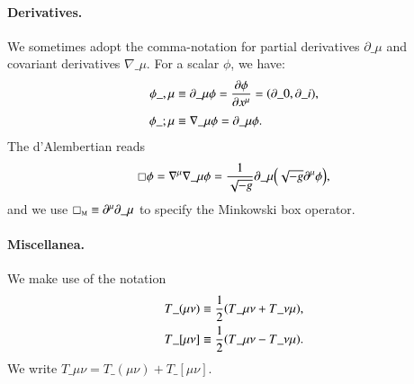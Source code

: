 




\paragraph{Derivatives.} 
We sometimes adopt the comma-notation for partial derivatives $\partial\_\mu$ and covariant derivatives $\nabla\_\mu$. For a scalar $\phi$, we have:
\begin{subequations}\label{eq:notation:comma_notation_darivatives}
    \begin{align}
        \phi\_{,\mu} &\equiv \partial\_\mu \phi = \pdv{\phi}{x\^\mu} =\pclosed{\partial\_0, \partial\_i }, \\
        \phi\_{;\mu} &\equiv \nabla\_\mu \phi = \partial\_\mu \phi . 
    \end{align}
\end{subequations}
The d'Alembertian reads
\begin{equation}\label{eq:notation:dAlembertian}
    \sq \phi  = \nabla\^\mu \nabla\_\mu \phi = \frac{1}{\sqrt{-g}} \partial\_\mu \pclosed{ \sqrt{-g} \partial\^\mu \phi},
\end{equation}
and we use $\sq\nped{M} \equiv \partial\^\mu\partial\_\mu$ to specify the Minkowski box operator.


\paragraph{Miscellanea.} %
We make use of the notation
\begin{subequations}\label{eq:notation:sym_and_antisym_tensor_notation}
    \begin{align}
        T\_{(\mu\nu)} &\equiv \frac{1}{2} {\left(  T\_{\mu\nu} + T\_{\nu\mu}   \right)}, \\
        T\_{[\mu\nu]} &\equiv \frac{1}{2} {\left(  T\_{\mu\nu} - T\_{\nu\mu}   \right)}.
    \end{align} 
\end{subequations}
We write $T\_{\mu\nu}= T\_{(\mu\nu)} + T\_{[\mu\nu]}$.



